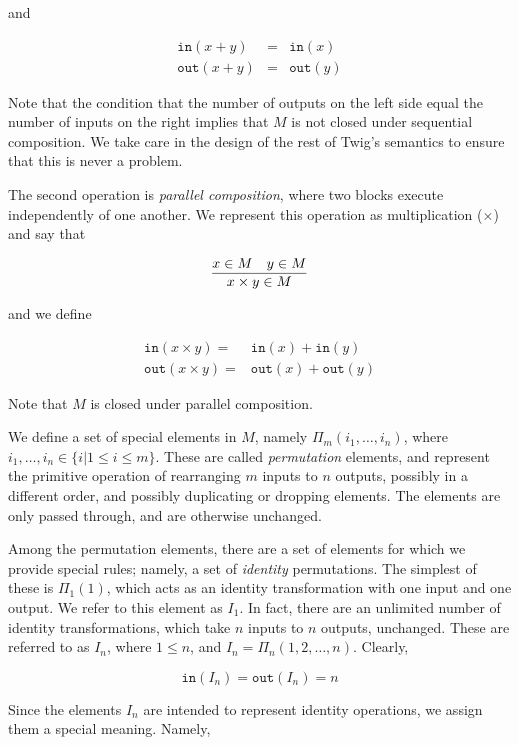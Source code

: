 and

\begin{eqnarray*}
\mathtt{in} (x+y) &=& \mathtt{in}(x)\\
\mathtt{out}(x+y) &=& \mathtt{out}(y)
\end{eqnarray*}

Note that the condition that the number of outputs on the left side equal the
number of inputs on the right implies that $M$ is not closed under sequential
composition. We take care in the design of the rest of Twig's semantics to
ensure that this is never a problem.

The second operation is \emph{parallel composition}, where two blocks execute
independently of one another. We represent this operation as multiplication
($\times$) and say that

\[
\infer
{x \times y \in M}
{x \in M \quad y \in M}
\]

and we define

\begin{eqnarray*}
\mathtt{in} (x \times y) =& \mathtt{in}(x)  + \mathtt{in}(y)\\
\mathtt{out}(x \times y) =& \mathtt{out}(x) + \mathtt{out}(y)
\end{eqnarray*}

Note that $M$ is closed under parallel composition.

We define a set of special elements in $M$, namely $\Pi_m(i_1,\ldots,i_n)$,
where $i_1,\ldots,i_n \in \lbrace i | 1 \leq i \leq m \rbrace$. These are
called \emph{permutation} elements, and represent the primitive operation of
rearranging $m$ inputs to $n$ outputs, possibly in a different order, and
possibly duplicating or dropping elements. The elements are only passed
through, and are otherwise unchanged.

Among the permutation elements, there are a set of elements for which we
provide special rules; namely, a set of \emph{identity} permutations. The
simplest of these is $\Pi_1(1)$, which acts as an identity transformation with
one input and one output. We refer to this element as $I_1$. In fact, there
are an unlimited number of identity transformations, which take $n$ inputs to
$n$ outputs, unchanged. These are referred to as $I_n$, where $1 \leq n$, and
$I_n = \Pi_n(1,2,\ldots,n)$. Clearly,

\[
\mathtt{in}(I_n) = \mathtt{out}(I_n) = n
\]

Since the elements $I_n$ are intended to represent identity operations, we
assign them a special meaning. Namely,

